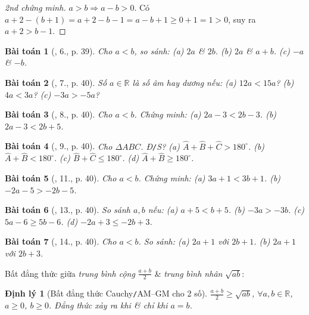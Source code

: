 \documentclass{article}
\newtheorem{baitoan}{Bài toán}
\newtheorem{dinhly}{Định lý}
\begin{document}
\begin{proof}[2nd chứng minh]
	$a > b\Rightarrow a - b > 0$. Có $a + 2 - (b + 1) = a + 2 - b - 1 = a - b + 1\ge0 + 1 = 1 > 0$, suy ra $a + 2 > b - 1$.
\end{proof}

\begin{baitoan}[\cite{SGK_Toan_8_tap_2}, 6., p. 39]
	Cho $a < b$, so sánh: (a) $2a$ \& $2b$. (b) $2a$ \& $a + b$. (c) $-a$ \& $-b$.
\end{baitoan}

\begin{baitoan}[\cite{SGK_Toan_8_tap_2}, 7., p. 40]
	Số $a\in\mathbb{R}$ là số âm hay dương nếu: (a) $12a < 15a$? (b) $4a < 3a$? (c) $-3a > -5a$?
\end{baitoan}

\begin{baitoan}[\cite{SGK_Toan_8_tap_2}, 8., p. 40]
	Cho $a < b$. Chứng minh: (a) $2a - 3 < 2b - 3$. (b) $2a - 3 < 2b + 5$.
\end{baitoan}

\begin{baitoan}[\cite{SGK_Toan_8_tap_2}, 9., p. 40]
	Cho $\Delta ABC$. \emph{Đ\texttt{/}S?} (a) $\widehat{A} + \widehat{B} + \widehat{C} > 180^\circ$. (b) $\widehat{A} + \widehat{B} < 180^\circ$. (c) $\widehat{B} + \widehat{C}\le180^\circ$. (d) $\widehat{A} + \widehat{B}\ge180^\circ$.
\end{baitoan}

\begin{baitoan}[\cite{SGK_Toan_8_tap_2}, 11., p. 40]
	Cho $a < b$. Chứng minh: (a) $3a + 1 < 3b + 1$. (b) $-2a - 5 > -2b - 5$.
\end{baitoan}

\begin{baitoan}[\cite{SGK_Toan_8_tap_2}, 13., p. 40]
	So sánh $a,b$ nếu: (a) $a + 5 < b + 5$. (b) $-3a > -3b$. (c) $5a - 6\ge5b - 6$. (d) $-2a + 3\le-2b + 3$. 
\end{baitoan}

\begin{baitoan}[\cite{SGK_Toan_8_tap_2}, 14., p. 40]
	Cho $a < b$. So sánh: (a) $2a + 1$ với $2b + 1$. (b) $2a + 1$ với $2b + 3$.
\end{baitoan}
Bất đẳng thức giữa \textit{trung bình cộng} $\frac{a + b}{2}$ \& \textit{trung bình nhân} $\sqrt{ab}$:

\begin{dinhly}[Bất đẳng thức Cauchy\texttt{/}AM--GM cho 2 số]
	 $\frac{a + b}{2}\ge\sqrt{ab}$, $\forall a,b\in\mathbb{R}$, $a\ge0$, $b\ge0$. Đẳng thức xảy ra khi \& chỉ khi $a = b$.
\end{dinhly}
\end{document}
